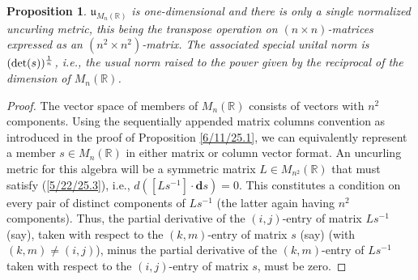 \documentclass{amsart}
\newtheorem{proposition}[theorem]{Proposition}
\theoremstyle{definition}
\numberwithin{theorem}{section}
\numberwithin{equation}{section}
\begin{document}
 \begin{proposition} \label{4/8/22.1} $\mathfrak{u}_{M_n(\mathbb{R})}$ is one-dimensional and there is only a single normalized uncurling metric, this being the  transpose operation on $(n\times n)$-matrices expressed as an $(n^2\times n^2)$-matrix. The associated special unital norm is $({\rm det}(s))^{\frac{1}{n}}$, i.e., the usual norm raised to the power given by the reciprocal of the dimension of $M_n(\mathbb{R})$. \end{proposition}
 \begin{proof} The vector space of members of $ M_n(\mathbb{R})$ consists of  vectors with $n^2$ components.   Using the sequentially appended matrix columns convention as introduced in the proof of Proposition \ref{6/11/25.1}, we can equivalently represent a member $s\in M_n(\mathbb{R})$ in either matrix or column vector format.   An uncurling metric for this algebra will be a symmetric matrix $L\in M_{n^2}(\mathbb{R})$ that must satisfy (\ref{5/22/25.3}), i.e., $d\left([Ls^{-1}]\cdot \mathbf{d}s\right)=0$. This constitutes a condition on every pair of distinct components of $Ls^{-1}$ (the latter again having $n^2$ components).  Thus,  the partial derivative of the  $(i,j)$-entry of matrix $Ls^{-1}$ (say), taken with respect to the $(k,m)$-entry of matrix $s$ (say) (with $(k,m)\ne (i,j)$),  minus  the partial derivative of the $(k,m)$-entry of $Ls^{-1}$  taken with respect to the $(i,j)$-entry of matrix $s$, must be zero.
 

\end{proof}
\end{document}
